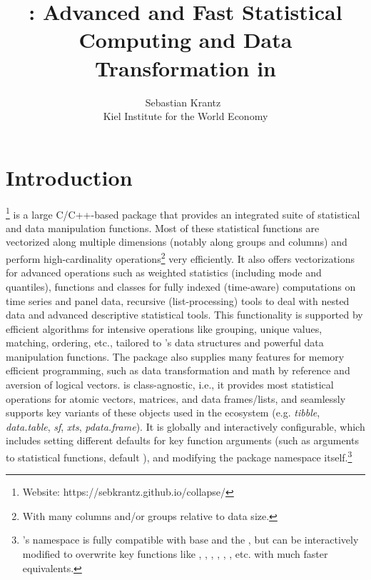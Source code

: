 \documentclass[article]{jss}
\author{Sebastian Krantz~\orcidlink{0000-0001-6212-5229}\\Kiel Institute for the World Economy}
\title{\proglang{collapse}: Advanced and Fast Statistical Computing and Data Transformation in \proglang{R}}
\begin{document}


\section[Introduction]{Introduction} \label{sec:intro}
%
\href{https://sebkrantz.github.io/collapse/}{}\footnote{Website: https://sebkrantz.github.io/collapse/} is a large C/C++-based  package that provides an integrated suite of statistical and data manipulation functions. Most of these statistical functions are vectorized along multiple dimensions (notably along groups and columns) and perform high-cardinality operations\footnote{With many columns and/or groups relative to data size.} very efficiently. It also offers vectorizations for advanced operations such as weighted statistics (including mode and quantiles), functions and classes for fully indexed (time-aware) computations on time series and panel data, recursive (list-processing) tools to deal with nested data and advanced descriptive statistical tools. This functionality is supported by efficient algorithms for intensive operations like grouping, unique values, matching, ordering, etc., tailored to 's data structures and powerful data manipulation functions. The package also supplies many features for memory efficient  programming, such as data transformation and math by reference and aversion of logical vectors.  is class-agnostic, i.e., it provides most statistical operations for atomic vectors, matrices, and data frames/lists, and seamlessly supports key variants of these objects used in the  ecosystem (e.g. \emph{tibble}, \emph{data.table}, \emph{sf}, \emph{xts}, \emph{pdata.frame}). It is globally and interactively configurable, which includes setting different defaults for key function arguments (such as  arguments to statistical functions, default ), and modifying the package namespace itself.\footnote{'s namespace is fully compatible with base  and the , but can be interactively modified to overwrite key functions like , , , , , ,  etc. with much faster  equivalents.} \newline
\end{document}

